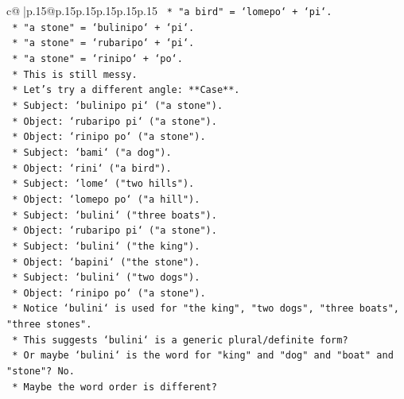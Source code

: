 \documentclass{article}
\begin{document}
{\begin{supertabular}{c@{$\;$}|p{.15\linewidth}@{}p{.15\linewidth}p{.15\linewidth}p{.15\linewidth}p{.15\linewidth}p{.15\linewidth}}
{{{\texttt{                    *   "a bird" = `lomepo` + `pi`.} \\
\texttt{                    *   "a stone" = `bulinipo` + `pi`.} \\
\texttt{                    *   "a stone" = `rubaripo` + `pi`.} \\
\texttt{                    *   "a stone" = `rinipo` + `po`.} \\
\texttt{                    *   This is still messy.} \\
\texttt{                    *   Let's try a different angle: **Case**.} \\
\texttt{                    *   Subject: `bulinipo pi` ("a stone").} \\
\texttt{                    *   Object: `rubaripo pi` ("a stone").} \\
\texttt{                    *   Object: `rinipo po` ("a stone").} \\
\texttt{                    *   Subject: `bami` ("a dog").} \\
\texttt{                    *   Object: `rini` ("a bird").} \\
\texttt{                    *   Subject: `lome` ("two hills").} \\
\texttt{                    *   Object: `lomepo po` ("a hill").} \\
\texttt{                    *   Subject: `bulini` ("three boats").} \\
\texttt{                    *   Object: `rubaripo pi` ("a stone").} \\
\texttt{                    *   Subject: `bulini` ("the king").} \\
\texttt{                    *   Object: `bapini` ("the stone").} \\
\texttt{                    *   Subject: `bulini` ("two dogs").} \\
\texttt{                    *   Object: `rinipo po` ("a stone").} \\
\texttt{                    *   Notice `bulini` is used for "the king", "two dogs", "three boats", "three stones".} \\
\texttt{                    *   This suggests `bulini` is a generic plural/definite form?} \\
\texttt{                    *   Or maybe `bulini` is the word for "king" and "dog" and "boat" and "stone"? No.} \\
\texttt{                    *   Maybe the word order is different?} \\
}}}
\end{supertabular}}
\end{document}
